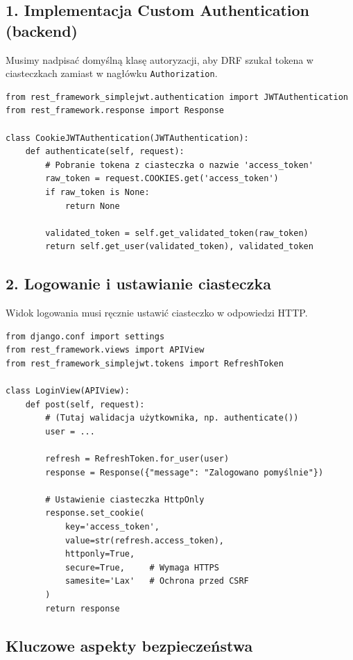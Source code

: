 \subsection*{1. Implementacja Custom Authentication (backend)}

Musimy nadpisać domyślną klasę autoryzacji, aby DRF szukał tokena w ciasteczkach zamiast w nagłówku \texttt{Authorization}.

\begin{verbatim}
from rest_framework_simplejwt.authentication import JWTAuthentication
from rest_framework.response import Response

class CookieJWTAuthentication(JWTAuthentication):
    def authenticate(self, request):
        # Pobranie tokena z ciasteczka o nazwie 'access_token'
        raw_token = request.COOKIES.get('access_token')
        if raw_token is None:
            return None

        validated_token = self.get_validated_token(raw_token)
        return self.get_user(validated_token), validated_token
\end{verbatim}

\subsection*{2. Logowanie i ustawianie ciasteczka}

Widok logowania musi ręcznie ustawić ciasteczko w odpowiedzi HTTP.

\begin{verbatim}
from django.conf import settings
from rest_framework.views import APIView
from rest_framework_simplejwt.tokens import RefreshToken

class LoginView(APIView):
    def post(self, request):
        # (Tutaj walidacja użytkownika, np. authenticate())
        user = ... 
        
        refresh = RefreshToken.for_user(user)
        response = Response({"message": "Zalogowano pomyślnie"})
        
        # Ustawienie ciasteczka HttpOnly
        response.set_cookie(
            key='access_token',
            value=str(refresh.access_token),
            httponly=True,
            secure=True,     # Wymaga HTTPS
            samesite='Lax'   # Ochrona przed CSRF
        )
        return response
\end{verbatim}

\subsection*{Kluczowe aspekty bezpieczeństwa}

